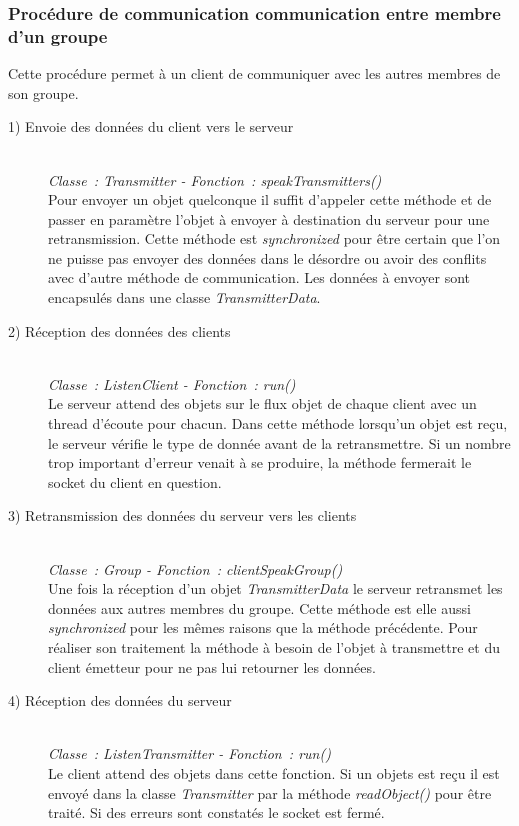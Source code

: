 \documentclass[a4paper,11pt]{report}
\begin{document}
\subsubsection{Procédure de communication communication entre membre d’un groupe}
Cette procédure permet à un client de communiquer avec les autres membres de son groupe.
\begin{description}
  \item[1) Envoie des données du client vers le serveur]
    \textit{\\Classe : Transmitter - Fonction : speakTransmitters()\\}
	  Pour envoyer un objet quelconque il suffit d’appeler cette méthode et de passer en paramètre l’objet à envoyer à destination du serveur pour une retransmission. Cette méthode est \textit{synchronized} pour être certain que l’on ne puisse pas envoyer des données dans le désordre ou avoir des conflits avec d’autre méthode de communication. Les données à envoyer sont encapsulés dans une classe \textit{TransmitterData}.
	
	\item[2) Réception des données des clients]
	\textit{\\Classe : ListenClient - Fonction : run()\\}
	  Le serveur attend des objets sur le flux objet de chaque client avec un thread d'écoute pour chacun.
Dans cette méthode lorsqu’un objet est reçu, le serveur vérifie le type de donnée avant de la retransmettre. Si un nombre trop important d’erreur venait à se produire, la méthode fermerait le socket du client en question.

  \item[3) Retransmission des données du serveur vers les clients]
  \textit{\\Classe : Group - Fonction : clientSpeakGroup()\\}
    Une fois la réception d’un objet  \textit{TransmitterData} le serveur retransmet les données aux autres membres du groupe. Cette méthode est elle aussi  \textit{synchronized} pour les mêmes raisons que la méthode précédente. Pour réaliser son traitement la méthode à besoin de l’objet à transmettre et du client émetteur pour ne pas lui retourner les données.
    
  \item[4) Réception des données du serveur]
  \textit{\\Classe : ListenTransmitter - Fonction : run()\\}
    Le client attend des objets dans cette fonction. Si un objets est reçu il est envoyé dans la classe \textit{Transmitter} par la méthode \textit{readObject()} pour être traité. Si des erreurs sont constatés le socket est fermé.
\end{description}
\end{document}
